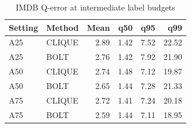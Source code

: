 \begin{table}[H]
\centering
\small
\setlength{\tabcolsep}{5pt}
\caption{IMDB Q-error at intermediate label budgets}
\label{tab:supplement-IMDB}
\begin{tabular}{@{}llrrrr@{}}
\toprule
Setting & Method & Mean & q50 & q95 & q99 \\
\midrule
A25 & CLIQUE & 2.89 & 1.42 & 7.52 & 22.52 \\
A25 & BOLT & 2.76 & 1.42 & 7.92 & 21.90 \\
A50 & CLIQUE & 2.74 & 1.48 & 7.12 & 19.87 \\
A50 & BOLT & 2.65 & 1.44 & 7.28 & 21.33 \\
A75 & CLIQUE & 2.72 & 1.41 & 7.24 & 20.18 \\
A75 & BOLT & 2.59 & 1.44 & 7.11 & 18.95 \\
\bottomrule
\end{tabular}
\end{table}
